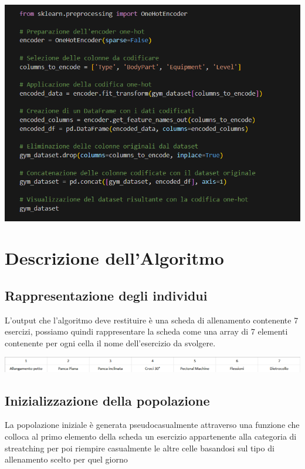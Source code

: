 \documentclass{book}
\begin{document}
\begin{itemize}
\includegraphics[width=1.0\linewidth]{onehotencoding.png}



\end{itemize}



\newpage
\section{Descrizione dell'Algoritmo}
\subsection{Rappresentazione degli individui}
L'output che l'algoritmo deve restituire è una scheda di allenamento contenente 7 esercizi, possiamo quindi rappresentare la scheda come una array di 7 elementi contenente per ogni cella il nome dell'esercizio da svolgere.\newline

\includegraphics[width=1.0\linewidth]{Rappresentazione.png}

\subsection{Inizializzazione della popolazione}
La popolazione iniziale è generata pseudocasualmente attraverso una funzione che colloca al primo elemento della scheda un esercizio appartenente alla categoria di streatching  per poi riempire casualmente le altre celle basandosi sul tipo di allenamento scelto per quel giorno\newline
\end{document}
